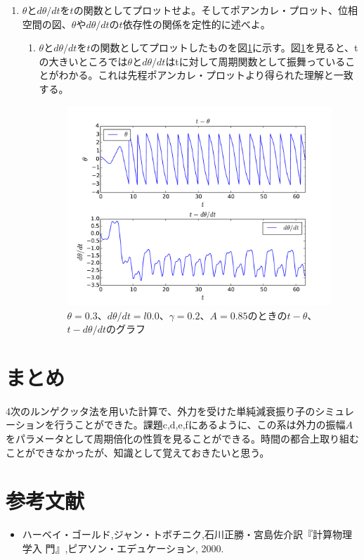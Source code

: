 \documentclass{jsarticle}
\begin{document}
\begin{enumerate}
            \item $\theta$と$d\theta /dt$を$t$の関数としてプロットせよ。そしてポアンカレ・プロット、位相空間の図、$\theta$や$d\theta /dt$の$t$依存性の関係を定性的に述べよ。
                \begin{enumerate}
                    \item $\theta$と$d\theta /dt$を$t$の関数としてプロットしたものを図\ref{fig:f2}に示す。図\ref{fig:f2}を見ると、tの大きいところでは$\theta$と$d\theta /dt$はtに対して周期関数として振舞っていることがわかる。これは先程ポアンカレ・プロットより得られた理解と一致する。
                    \begin{figure}[H]
                        \begin{center}
                        \includegraphics[width=12.5cm]{figure_2.pdf}
                        \caption{$\theta=0.3$、$d\theta /dt = l0.0$、$\gamma=0.2$、$A=0.85$のときの$t-\theta$、$t-d\theta /dt$のグラフ}
                        \label{fig:f2}
                        \end{center}
                    \end{figure}
                    
                    
                    
                \end{enumerate} 
                
        \end{enumerate}
    
    \section{まとめ}
        4次のルンゲクッタ法を用いた計算で、外力を受けた単純減衰振り子のシミュレーションを行うことができた。課題c,d,e,fにあるように、この系は外力の振幅$A$をパラメータとして周期倍化の性質を見ることができる。時間の都合上取り組むことができなかったが、知識として覚えておきたいと思う。

    \section{参考文献}
        \begin{itemize}
            \item ハーベイ・ゴールド,ジャン・トボチニク,石川正勝・宮島佐介訳『計算物理学入
            門』,ピアソン・エデュケーション, 2000.
        \end{itemize}
\end{document}
